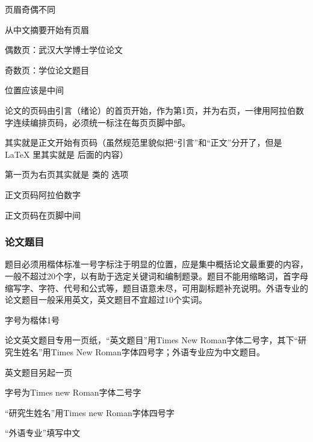 \begin{points}
  \item 页眉奇偶不同
  \item 从中文摘要开始有页眉
  \item 偶数页：武汉大学博士学位论文
  \item 奇数页：学位论文题目
  \item 位置应该是中间
\end{points}

\begin{reference}
  论文的页码由引言（绪论）的首页开始，作为第1页，并为右页，一律用阿拉伯数字连续编排页码，必须统一标注在每页页脚中部。
\end{reference}

\begin{points}
  \item 其实就是正文开始有页码（虽然规范里貌似把“引言”和“正文”分开了，但是 \LaTeX{} 里其实就是  后面的内容）
  \item 第一页为右页其实就是  类的  选项
  \item 正文页码阿拉伯数字
  \item 正文页码在页脚中间
\end{points}


\subsubsection{论文题目}

\begin{reference}
  题目必须用楷体标准一号字标注于明显的位置，应是集中概括论文最重要的内容，一般不超过20个字，以有助于选定关键词和编制题录。题目不能用缩略词，首字母缩写字、字符、代号和公式等，题目语意未尽，可用副标题补充说明。外语专业的论文题目一般采用英文，英文题目不宜超过10个实词。
\end{reference}

\begin{points}
  \item 字号为楷体1号
\end{points}


\begin{reference}
  论文英文题目专用一页纸，“英文题目”用Times New Roman字体二号字，其下“研究生姓名”用Times New Roman字体四号字；外语专业应为中文题目。
\end{reference}

\begin{points}
  \item 英文题目另起一页
  \item 字号为Times new Roman字体二号字
  \item “研究生姓名”用Times new Roman字体四号字
  \item “外语专业”填写中文
\end{points}


